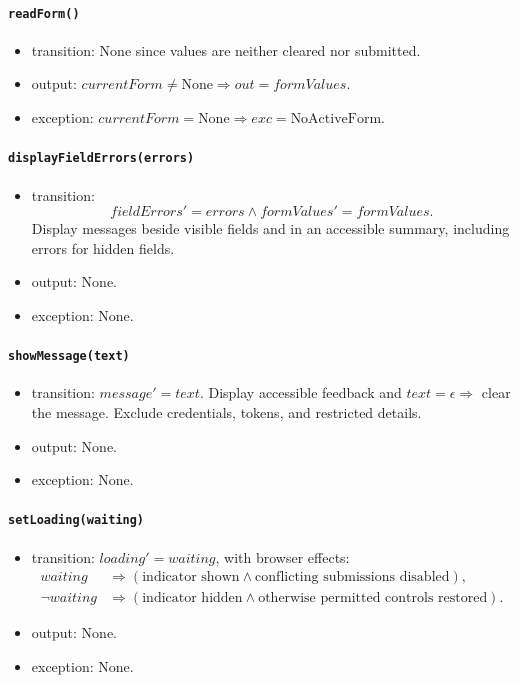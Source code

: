 \documentclass[12pt, titlepage]{article}
\begin{document}
\paragraph{\texttt{readForm()}}
\begin{itemize}
  \item transition: None since values are neither cleared nor submitted.
  \item output:
  $\mathit{currentForm}\ne\text{None}\Rightarrow out=\mathit{formValues}$.
  \item exception:
  $\mathit{currentForm}=\text{None}\Rightarrow exc=\text{NoActiveForm}$.
\end{itemize}

\paragraph{\texttt{displayFieldErrors(errors)}}
\begin{itemize}
  \item transition:
  \[
    \mathit{fieldErrors}'=errors
    \land \mathit{formValues}'=\mathit{formValues}.
  \]
  Display messages beside visible fields and in an accessible summary, including errors for hidden fields.
  \item output: None.
  \item exception: None.
\end{itemize}

\paragraph{\texttt{showMessage(text)}}
\begin{itemize}
  \item transition: $\mathit{message}'=text$. Display accessible feedback and $text=\epsilon\Rightarrow$ clear the message. Exclude credentials, tokens, and restricted details.
  \item output: None.
  \item exception: None.
\end{itemize}

\paragraph{\texttt{setLoading(waiting)}}
\begin{itemize}
  \item transition: $\mathit{loading}'=waiting$, with browser effects:
  \[
  \begin{aligned}
    waiting &\Rightarrow (\text{indicator shown}\land
                          \text{conflicting submissions disabled}),\\
    \neg waiting &\Rightarrow (\text{indicator hidden}\land
                          \text{otherwise permitted controls restored}).
  \end{aligned}
  \]
  \item output: None.
  \item exception: None.
\end{itemize}
\end{document}
